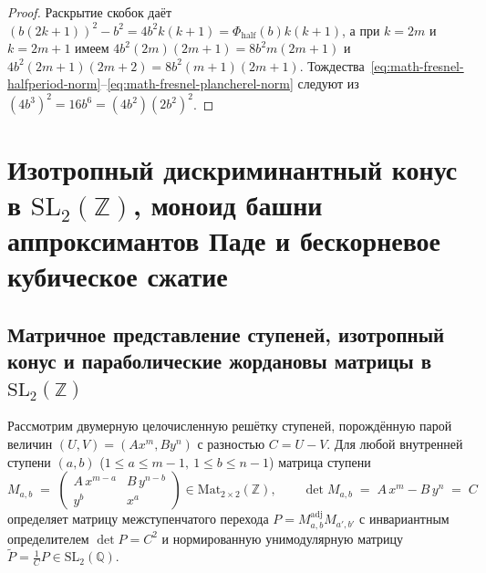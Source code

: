 \begin{proof}
\leanok
Раскрытие скобок даёт $(b(2k+1))^2 - b^2 = 4b^2 k(k+1) = \Phi_{\mathrm{half}}(b)k(k+1)$, а при $k = 2m$ и $k = 2m+1$ имеем $4b^2(2m)(2m+1) = 8b^2 m(2m+1)$ и $4b^2(2m+1)(2m+2) = 8b^2(m+1)(2m+1)$. Тождества~\eqref{eq:math-fresnel-halfperiod-norm}--\eqref{eq:math-fresnel-plancherel-norm} следуют из $(4b^3)^2 = 16b^6 = (4b^2)(2b^2)^2$.
\end{proof}

\chapter{Изотропный дискриминантный конус в \texorpdfstring{$\mathrm{SL}_2(\mathbb{Z})$}{SL2(Z)}, моноид башни аппроксимантов Паде и бескорневое кубическое сжатие}
\label{ch:math-pade-sl2-towers}

\section{Матричное представление ступеней, изотропный конус и параболические жордановы матрицы в \texorpdfstring{$\mathrm{SL}_2(\mathbb{Z})$}{SL2(Z)}}

Рассмотрим двумерную целочисленную решётку ступеней, порождённую парой величин $(U, V) = (A x^m, B y^n)$ с разностью $C = U - V$. Для любой внутренней ступени $(a, b)$ ($1 \le a \le m-1,\ 1 \le b \le n-1$) матрица ступени
\begin{equation}
  \label{eq:math-stage-matrix}
  M_{a,b} \;=\; \begin{pmatrix} A\,x^{m-a} & B\,y^{n-b} \\ y^b & x^a \end{pmatrix} \in \mathrm{Mat}_{2\times 2}(\mathbb{Z}),
  \qquad \det M_{a,b} \;=\; A\,x^m - B\,y^n \;=\; C
\end{equation}
определяет матрицу межступенчатого перехода $P = M_{a,b}^{\mathrm{adj}} M_{a',b'}$ с инвариантным определителем $\det P = C^2$ и нормированную унимодулярную матрицу $\widetilde{P} = \frac{1}{C}P \in \mathrm{SL}_2(\mathbb{Q})$.

